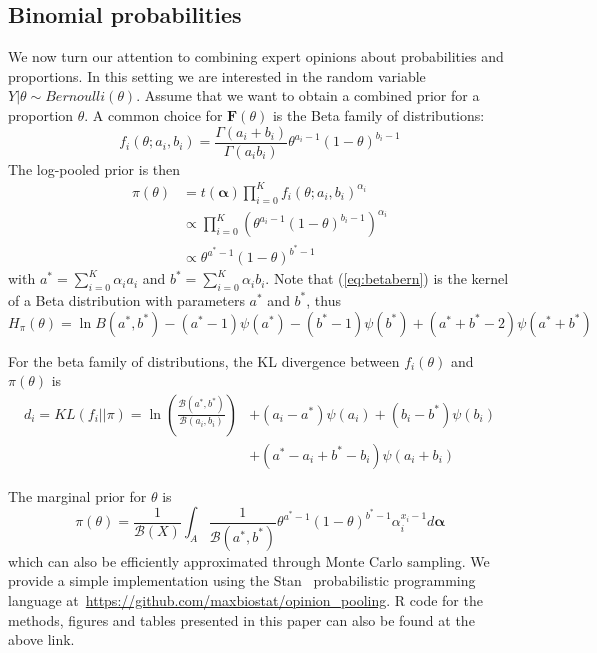 \documentclass[a4paper, notitlepage, 10pt]{article}
\begin{document}
\subsection*{Binomial probabilities}
\label{sec:beta}
We now turn our attention to combining expert opinions about probabilities and proportions.
In this setting we are interested in the random variable $Y | \theta \sim Bernoulli(\theta)$.
Assume that we want to obtain a combined prior for a proportion $\theta$.
A common choice for $\mathbf{F}(\theta)$ is the Beta family of distributions:
$$f_i(\theta;a_i, b_i) = \frac{\Gamma(a_i + b_i)}{\Gamma(a_i b_i)} \theta^{a_i-1}(1-\theta)^{b_i-1}$$
The log-pooled prior is then
\begin{align}
\pi(\theta)&= t(\boldsymbol\alpha)\prod_{i=0}^{K}f_i(\theta;a_i,b_i)^{\alpha_i}\\
&\propto \prod_{i=0}^{K} \left(\theta^{a_i-1}(1-\theta)^{b_i-1} \right)^{\alpha_i}\\
\label{eq:betabern}
&\propto \theta^{a^*-1}(1-\theta)^{b^*-1}
\end{align}
with $a^* =\sum_{i=0}^{K}\alpha_ia_i$ and $b^* = \sum_{i=0}^{K}\alpha_ib_i$.
Note that (\ref{eq:betabern}) is the kernel of a Beta distribution with parameters $a^*$ and $b^*$, thus 
\begin{equation}
 \label{eq:entropybeta}
 H_{\pi}(\theta) = \ln B(a^*,b^*) - (a^*-1)\psi(a^*) - (b^*-1)\psi(b^*) + (a^*+b^* -2)\psi(a^*+b^*)
\end{equation}

For the beta family of distributions, the KL divergence between $f_i(\theta)$ and $\pi(\theta)$ is
\begin{equation}
\begin{split}
 \label{eq:KLbeta}
 d_i = KL(f_i||\pi) = \ln\left(\frac{\mathcal{B}(a^*, b^*)}{\mathcal{B}(a_i, 
b_i)}\right) &+ (a_i-a^*)\psi(a_i)+ (b_i-b^*)\psi(b_i) \\
 &+ (a^*-a_i + b^* - b_i)\psi(a_i+b_i)
\end{split}
 \end{equation}

The marginal prior for $\theta$ is
\begin{equation}
\label{eq:marginalbeta}
\pi(\theta) = \frac{1}{\mathcal{B}(X)}\int_{A} \frac{1}{\mathcal{B}(a^*, b^*)} \theta^{a^* -1}(1-\theta)^{b^* -1}\alpha_i^{x_i-1}d\boldsymbol\alpha 
\end{equation}
which can also be efficiently approximated through Monte Carlo sampling.
We provide a simple implementation using the Stan~\citep{stan2014} probabilistic programming language at~\url{https://github.com/maxbiostat/opinion_pooling}.
R code for the methods, figures and tables presented in this paper can also be found at the above link.
\end{document}
